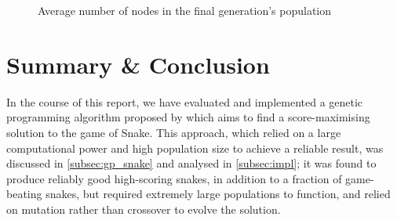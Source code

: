 \documentclass[british,10pt,a4paper]{article}
\begin{document}
\begin{figure}
  \vspace{-50pt}
  \begin{center}
	  \vspace{-5pt}
		\caption{Average number of nodes in the final generation's population}
		\label{fig:box_plot_algorithm_size}
	  \vspace{-10pt}
	  \end{center}
\end{figure}
\section{Summary \& Conclusion}
In the course of this report, we have evaluated and implemented a genetic programming algorithm proposed by \citet{Ehlis2000-sz} which aims to find a score-maximising solution to the game of Snake. This approach, which relied on a large computational power and high population size to achieve a reliable result, was discussed in \autoref{subsec:gp_snake} and analysed in \autoref{subsec:impl}; it was found to produce reliably good high-scoring snakes, in addition to a fraction of game-beating snakes, but required extremely large populations to function, and relied on mutation rather than crossover to evolve the solution. \newline
\end{document}
